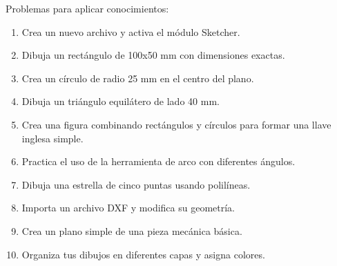 Problemas para aplicar conocimientos:
\begin{enumerate}
	\item Crea un nuevo archivo y activa el módulo Sketcher.
	\item Dibuja un rectángulo de 100x50 mm con
	      dimensiones exactas.
	\item Crea un círculo de radio 25 mm en el centro del
	      plano.
	\item Dibuja un triángulo equilátero de lado 40 mm.
	\item Crea una figura combinando rectángulos y círculos
	      para formar una llave inglesa simple.
	\item Practica el uso de la herramienta de arco con
	      diferentes ángulos.
	\item Dibuja una estrella de cinco puntas usando
	      polilíneas.
	\item Importa un archivo DXF y modifica su geometría.
	\item Crea un plano simple de una pieza mecánica básica.
	\item Organiza tus dibujos en diferentes capas y
	      asigna colores.
\end{enumerate}